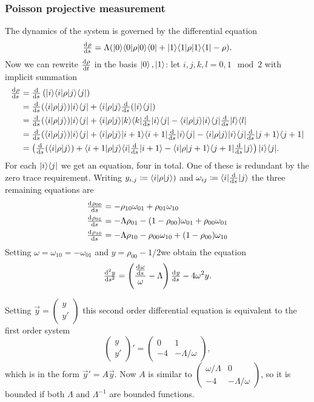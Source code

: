 \subsubsection{Poisson projective measurement}
The dynamics of the system is governed by the differential equation
\[ \od{\rho}{s} = \Lambda(\ketbra{0}{0}\rho \ketbra{0}{0} + \ketbra{1}{1} \rho \ketbra{1}{1} - \rho). \]
Now we can rewrite $\od{\rho}{t}$ in the basis $ \left| 0 \right\rangle, \left| 1 \right\rangle$: let $i,j,k,l=0,1 \mod 2$ with implicit summation
\begin{align*}
\od{\rho}{s} &= \od{}{s}\left(\ketbra{i}{i}\rho\ketbra{j}{j}\right) \\
&= \od{}{s}(\braket[\rho]{i}{j})\ketbra{i}{j} + \braket[\rho]{i}{j}\od{}{s}(\ketbra{i}{j}) \\
&= \od{}{s}(\braket[\rho]{i}{j})\ketbra{i}{j} + \braket[\rho]{i}{j}\ketbra{k}{k}\od{}{s}\ketbra{i}{j} - \braket[\rho]{i}{j}\ketbra{i}{j}\od{}{s}\ketbra{l}{l} \\
&= \od{}{s}(\braket[\rho]{i}{j})\ketbra{i}{j} + \braket[\rho]{i}{j}\ketbra{i+1}{i+1}\od{}{s}\ketbra{i}{j} - \braket[\rho]{i}{j}\ketbra{i}{j}\od{}{s}\ketbra{j+1}{j+1} \\
&= \left(\od{}{s}(\braket[\rho]{i}{j}) + \braket[\rho]{i+1}{j}\braket[\od{}{s}]{i}{i+1}  - \braket[\rho]{i}{j+1}\braket[\od{}{s}]{j+1}{j}\right)\ketbra{i}{j}. \\
\end{align*}
For each $|i\rangle\langle j|$ we get an equation, four in total. One of these is redundant by the zero trace requirement. Writing $y_{i,j}\defeq \braket[\rho]{i}{j})$ and $\omega_{ij} \defeq \braket[\od{}{s}]{i}{j}$ the three remaining equations are
\begin{align*}
\od{\rho_{00}}{s} &= -\rho_{10}\omega_{01} + \rho_{01}\omega_{10} \\
\od{\rho_{01}}{s} &= -\Lambda \rho_{01} - (1-\rho_{00})\omega_{01} + \rho_{00}\omega_{01} \\
\od{\rho_{10}}{s} &= -\Lambda \rho_{10} - \rho_{00}\omega_{10} + (1-\rho_{00})\omega_{10}
\end{align*}
Setting $\omega = \omega_{10} = - \omega_{01}$ and $y = \rho_{00} - 1/2$we obtain the equation
\[ \od[2]{y}{s} = \left(\frac{\od{\omega}{s}}{\omega}-\Lambda\right)\od{y}{s} - 4\omega^2y. \]


Setting $\vec{y} = \begin{pmatrix}
y \\ y'
\end{pmatrix}$ this second order differential equation is equivalent to the first order system
\[ \begin{pmatrix}
y \\ y'
\end{pmatrix}' = \begin{pmatrix}
0 & 1 \\ -4 & -\Lambda/\omega
\end{pmatrix}, \]
which is in the form $\vec{y}' = A \vec{y}$. Now $A$ is similar to $\begin{pmatrix}
    \omega/\Lambda & 0 \\ -4 & -\Lambda/\omega
\end{pmatrix}$, so it is bounded if both $\Lambda$ and $\Lambda^{-1}$ are bounded functions.


